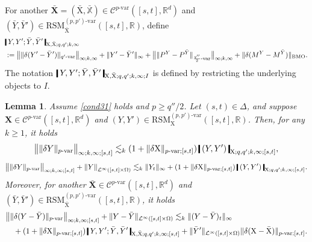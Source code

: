 \documentclass[11pt,reqno]{amsart}
\newtheorem{lemma}{Lemma}[section]
\numberwithin{equation}{section}
\def\R{\mathbb R}
\newcommand{\shortthickbar}{%
  \vcenter{\hbox{\rule{1.8pt}{2.2ex}}}%
}
\newcommand{\thicknm}[1]{%
  \mathopen{\shortthickbar}%
  \mkern4mu #1 \mkern4mu%
  \mathclose{\shortthickbar}%
}
\begin{document}
For another $\bar{\mathbf X} = (\bar{\mathrm X},\bar{\mathbb X}) \in \mathscr C^{p\text{-}\mathrm{var}}([s,t],\R^d)$ and $(\bar Y,\bar Y') \in \mathrm{RSM}^{(p,p')\text{-}\mathrm{var}}_{\bar{\mathrm X}}([s,t],\R)$, define 
\begin{equation*}
\begin{aligned}
&\thicknm{Y,Y';\bar Y,\bar Y'}_{\mathrm X,\bar{\mathrm X};q,q';k,\infty} \\
&:=  \big\| \|\delta (Y' - \bar Y')\|_{q'\text{-}\mathrm{var}}\big\|_{\infty;k,\infty} + \|Y' - \bar Y'\|_{\infty} + \big\| \|P^{Y} - P^{\bar Y}\|_{\frac{q''}{2}\text{-}\mathrm{var}} \big\|_{\infty;k,\infty} + \|\delta (M^{Y} - M^{\bar Y})\|_{\mathrm{BMO}}.
\end{aligned}
\end{equation*}
The notation $\thicknm{Y,Y';\bar Y,\bar Y'}_{\mathrm X,\bar{\mathrm X};q,q';k,\infty;I}$ is defined by restricting the underlying objects to $I$.

\begin{lemma}\label{lem:Y <= R^Y'}
Assume \eqref{cond31} holds and $p \ge q''/2$. Let $(s,t) \in \Delta$, and suppose $\mathbf X \in \mathscr C^{p\text{-}\mathrm{var}}([s,t],\R^d)$ and $(Y,Y') \in \mathrm{RSM}^{(p,p')\text{-}\mathrm{var}}_{\mathrm X}([s,t],\R)$. Then, for any $k \ge 1$, it holds 
\begin{equation}\label{e:Y q-var infty}
\big\|\|\delta Y \|_{p\text{-}\mathrm{var}} \big\|_{\infty;k,\infty;[s,t]} \lesssim_k (1 + \|\delta \mathrm X\|_{p\text{-}\mathrm{var};[s,t]}) \, \thicknm{(Y,Y')}_{\mathrm X;q,q';k,\infty;[s,t]},
\end{equation}
\begin{equation}\label{e:Y q-var infty infty}
\big\|\|\delta Y \|_{p\text{-}\mathrm{var}} \big\|_{\infty;k,\infty;[s,t]} + \left\|Y\right\|_{\mathcal L^{\infty}([s,t]\times\Omega)}  \lesssim_k \|Y_{t}\|_{\infty} + (1 + \|\delta \mathrm X\|_{p\text{-}\mathrm{var};[s,t]})\,  \thicknm{(Y,Y')}_{\mathrm X;q,q';k,\infty;[s,t]}.
\end{equation}
Moreover, for another $\bar{\mathbf X} \in \mathscr C^{p\text{-}\mathrm{var}}([s,t],\R^d)$ and $(\bar Y,\bar Y') \in \mathrm{RSM}^{(p,p')\text{-}\mathrm{var}}_{\bar{\mathrm X}}([s,t],\R)$, it holds 
\begin{equation}\label{e:Y - Y q-var infty infty}
\begin{aligned}
&\big\|\|\delta (Y - \bar Y) \|_{p\text{-}\mathrm{var}} \big\|_{\infty;k,\infty;[s,t]} + \|Y - \bar Y\|_{\mathcal L^{\infty}([s,t]\times\Omega)} \lesssim_k \|(Y -\bar Y)_{t}\|_{\infty}\\
&\quad  + (1 + \|\delta \mathrm X\|_{p\text{-}\mathrm{var};[s,t]})\,  \thicknm{Y,Y';\bar Y,\bar Y'}_{\mathrm X,\bar{\mathrm X};q,q';k,\infty;[s,t]} + \|\bar Y'\|_{\mathcal L^{\infty}([s,t] \times \Omega)} \|\delta (\mathrm X - \bar{\mathrm X})\|_{p\text{-}\mathrm{var};[s,t]}. 
\end{aligned}
\end{equation}
\end{lemma}
\end{document}
